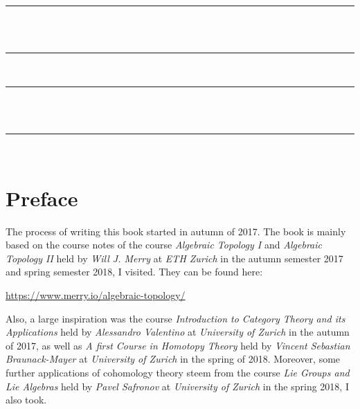 


\pagecolor{blue}
\color{white}

\begin{titlepage}
	\begin{center}
	\rule{\linewidth}{0.5mm} \\[0.4cm]
	\\
	\rule{\linewidth}{0.5mm} \\[1.5cm]
	\end{center}
\end{titlepage}
\nopagecolor
\color{black} 

\frontmatter

\thispagestyle{empty}
	\begin{center}
	\rule{\linewidth}{0.5mm} \\[0.4cm]
	\\
	\rule{\linewidth}{0.5mm} \\[1.5cm]
\end{center}
\clearpage

\chapter*{Preface}
The process of writing this book started in autumn of 2017. The book is mainly based on the course notes of the course \emph{Algebraic Topology I} and \emph{Algebraic Topology II} held by \emph{Will J. Merry} at \emph{ETH Zurich} in the autumn semester 2017 and spring semester 2018, I visited. They can be found here:
\begin{center}
	\href{https://www.merry.io/algebraic-topology/}{https://www.merry.io/algebraic-topology/}
\end{center}
Also, a large inspiration was the course \emph{Introduction to Category Theory and its Applications} held by \emph{Alessandro Valentino} at \emph{University of Zurich} in the autumn of 2017, as well as \emph{A first Course in Homotopy Theory} held by \emph{Vincent Sebastian Braunack-Mayer} at \emph{University of Zurich} in the spring of 2018. Moreover, some further applications of cohomology theory steem from the course \emph{Lie Groups and Lie Algebras} held by \emph{Pavel Safronov} at \emph{University of Zurich} in the spring 2018, I also took.\\

